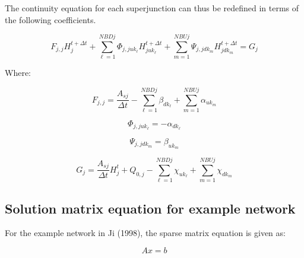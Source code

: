 \documentclass[11pt]{article}
\begin{document}
The continuity equation for each superjunction can thus be redefined in terms of
the following coefficients.

\begin{equation}
 \boxed{
 F_{j,j} H_{j}^{t + \Delta t} + \sum_{\ell=1}^{NBDj} \Phi_{j,juk_\ell} H_{juk_\ell}^{t + \Delta t} + \sum_{m=1}^{NBUj} \Psi_{j,jdk_m} H_{jdk_m}^{t + \Delta t} = G_j
 }
\end{equation}

Where:

\begin{equation}
  \boxed{
  F_{j,j} = \frac{A_{sj}}{\Delta t} - \sum_{\ell=1}^{NBDj} \beta_{dk_\ell} + \sum_{m=1}^{NBUj} \alpha_{uk_m}
  }
\end{equation}

\begin{equation}
  \boxed{
  \Phi_{j,juk_\ell} = - \alpha_{dk_\ell}
  }
\end{equation}

\begin{equation}
  \boxed{
  \Psi_{j,jdk_m} = \beta_{uk_m}
  }
\end{equation}

\begin{equation}
  \boxed{
  G_j = \frac{A_{sj}}{\Delta t} H_j^t + Q_{0,j} - \sum_{\ell=1}^{NBDj} \chi_{uk_\ell} + \sum_{m=1}^{NBUj} \chi_{dk_m}
  }
\end{equation}

\subsection*{Solution matrix equation for example network}

For the example network in Ji (1998), the sparse matrix equation is given as:

\begin{equation}
  A x = b
\end{equation}
\end{document}
